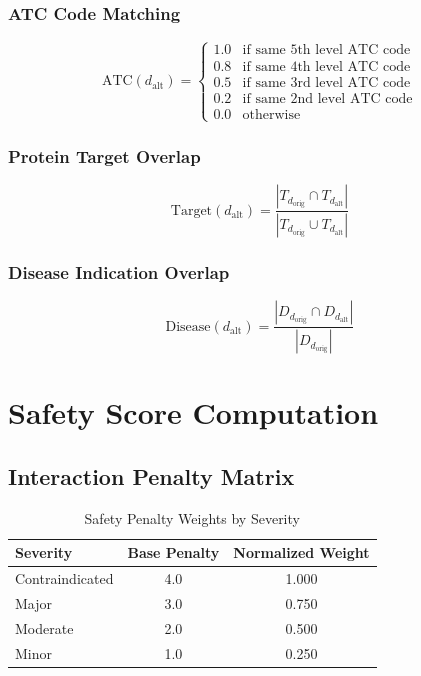 \documentclass[11pt,a4paper]{article}
\begin{document}
\subsubsection{ATC Code Matching}
\begin{equation}
\text{ATC}(d_{\text{alt}}) = \begin{cases}
1.0 & \text{if same 5th level ATC code} \\
0.8 & \text{if same 4th level ATC code} \\
0.5 & \text{if same 3rd level ATC code} \\
0.2 & \text{if same 2nd level ATC code} \\
0.0 & \text{otherwise}
\end{cases}
\end{equation}

\subsubsection{Protein Target Overlap}
\begin{equation}
\text{Target}(d_{\text{alt}}) = \frac{|T_{d_{\text{orig}}} \cap T_{d_{\text{alt}}}|}{|T_{d_{\text{orig}}} \cup T_{d_{\text{alt}}}|}
\end{equation}

\subsubsection{Disease Indication Overlap}
\begin{equation}
\text{Disease}(d_{\text{alt}}) = \frac{|D_{d_{\text{orig}}} \cap D_{d_{\text{alt}}}|}{|D_{d_{\text{orig}}}|}
\end{equation}

\section{Safety Score Computation}

\subsection{Interaction Penalty Matrix}

\begin{table}[H]
\centering
\caption{Safety Penalty Weights by Severity}
\label{tab:safety_penalties}
\begin{tabular}{lcc}
\toprule
\textbf{Severity} & \textbf{Base Penalty} & \textbf{Normalized Weight} \\
\midrule
Contraindicated & 4.0 & 1.000 \\
Major & 3.0 & 0.750 \\
Moderate & 2.0 & 0.500 \\
Minor & 1.0 & 0.250 \\
\bottomrule
\end{tabular}
\end{table}
\end{document}
